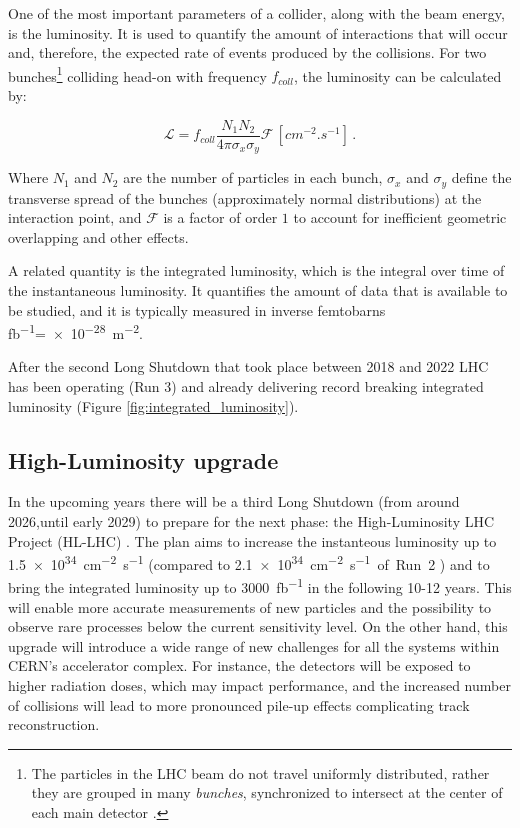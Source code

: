 One of the most important parameters of a collider, along with the beam energy, is the luminosity. It is used to quantify the amount of interactions that will occur and, therefore, the expected rate of events produced by the collisions. For two bunches\footnote{\label{footnote:particle_beam_bunches} The particles in the LHC beam do not travel uniformly distributed, rather they are grouped in many \textit{bunches}, synchronized to intersect at the center of each main detector%
.} colliding head-on with frequency $f_{coll}$, the luminosity can be calculated by:

\begin{equation}
    \mathcal{L} = f_{coll}\frac{N_1 N_2}{4\pi \sigma_x \sigma_y} \mathcal{F} \, \left[\unit{cm^{-2}.s^{-1}}\right] \, .
\end{equation}

Where $N_1$ and $N_2$ are the number of particles in each bunch, $\sigma_x$ and $\sigma_y$ define the transverse spread of the bunches (approximately normal distributions) at the interaction point, and $\mathcal{F}$ is a factor of order $1$ to account for inefficient geometric overlapping and other effects.

A related quantity is the integrated luminosity, which is the integral over time of the instantaneous luminosity. It quantifies the amount of data that is available to be studied, and it is typically measured in inverse femtobarns \unit{\femto\barn^{-1}}=\qty{e-28}{\meter^{-2}}.

After the second Long Shutdown that took place between 2018 and 2022 LHC has been operating (Run 3) and already delivering record breaking integrated luminosity (Figure \ref{fig:integrated_luminosity}).

\subsection{High-Luminosity upgrade}\label{subsec:high_luminosity_upgrade}
In the upcoming years there will be a third Long Shutdown (from around 2026,until early 2029) to prepare for the next phase: the High-Luminosity LHC Project (HL-LHC) \cite{cernHLLHCProject}. The plan aims to increase the instanteous luminosity up to \qty{1.5e34}{\centi\meter^{-2}\second^{-1}} (compared to \qty{2.1e34}{\centi\meter^{-2}\second^{-1} of Run 2} \cite{CERN-LHCC-2020-007}) and to bring the integrated luminosity up to \qty{3000}{\femto\barn^{-1}} in the following 10-12 years. This will enable more accurate measurements of new particles and the possibility to observe rare processes below the current sensitivity level. On the other hand, this upgrade will introduce a wide range of new challenges for all the systems within CERN's accelerator complex. For instance, the detectors will be exposed to higher radiation doses, which may impact performance, and the increased number of collisions will lead to more pronounced pile-up effects complicating track reconstruction.


